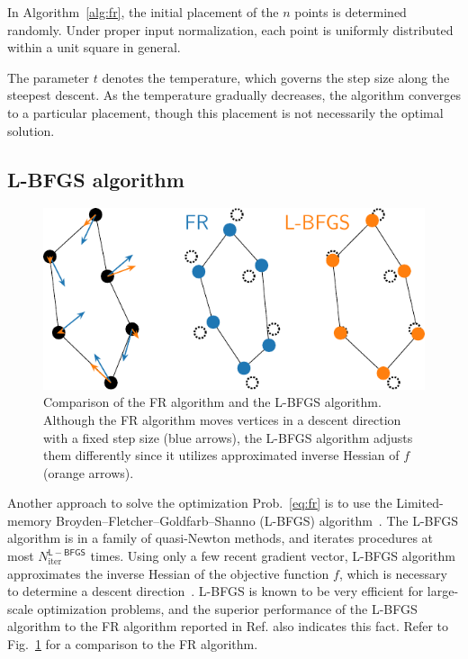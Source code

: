 \documentclass[dvipdfmx,10pt,journal,compsoc]{IEEEtran}
\begin{document}
In Algorithm~\ref{alg:fr}, the initial placement of the $n$ points is determined randomly. Under proper input normalization, each point is uniformly distributed within a unit square in general.

The parameter $t$ denotes the temperature, which governs the step size along the steepest descent. As the temperature gradually decreases, the algorithm converges to a particular placement, though this placement is not necessarily the optimal solution.

\subsection{L-BFGS algorithm}\label{ssec:lbfgs}

\begin{figure}[t]
  \centering
  \includegraphics[width=0.713\columnwidth]{comparison/comparison_FRandLBFGS.pdf}
  \caption{
    Comparison of the FR algorithm and the L-BFGS algorithm.
    Although the FR algorithm moves vertices in a descent direction with a fixed step size (blue arrows), the L-BFGS algorithm adjusts them differently since it utilizes approximated inverse Hessian of $f$ (orange arrows).
  }
  \label{fig:comparisonFRandLBFGS}
\end{figure}

Another approach to solve the optimization Prob.~\eqref{eq:fr} is to use the Limited-memory Broyden--Fletcher--Goldfarb--Shanno (L-BFGS) algorithm~\cite{6183577}.
The L-BFGS algorithm is in a family of quasi-Newton methods, and iterates procedures at most $N_\mathrm{iter}^{\mathsf{L-BFGS}}$ times.
Using only a few recent gradient vector, L-BFGS algorithm approximates the inverse Hessian of the objective function $f$, which is necessary to determine a descent direction~\cite{liuLimitedMemoryBFGS1989}.
L-BFGS is known to be very efficient for large-scale optimization problems, and the superior performance of the L-BFGS algorithm to the FR algorithm reported in Ref.\cite{6183577} also indicates this fact. Refer to Fig.~\ref{fig:comparisonFRandLBFGS} for a comparison to the FR algorithm.
\end{document}
